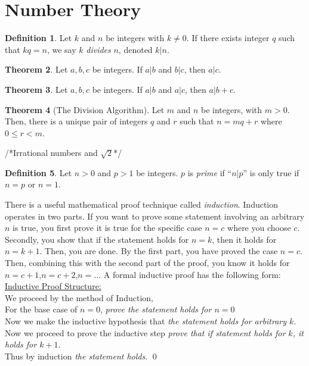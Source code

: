 \documentclass[11pt]{article}
\theoremstyle{definition}
\newtheorem{theorem}{Theorem}[section]
\newtheorem{definition}[theorem]{Definition}
\begin{document}
\section{Number Theory}
\begin{definition}
    Let $k$ and $n$ be integers with $k \neq 0$. If there exists integer $q$ such that $kq=n$, we say $k$ \emph{divides} $n$, denoted $k \vert n$.
\end{definition}
\begin{theorem}
    Let $a,b,c$ be integers. If $a \vert b$ and $b \vert c$, then $a \vert c$.
\end{theorem}
\begin{theorem}
    Let $a,b,c$ be integers. If $a \vert b$ and $a \vert c$, then $a \vert b+c$.
\end{theorem}
\begin{theorem} [The Division Algorithm]
    Let $m$ and $n$ be integers, with $m>0$. Then, there is a unique pair of integers $q$ and $r$ such that $n = mq+r$ where $0 \leq r < m$. 
\end{theorem}
/*Irrational numbers and $\sqrt{2}$*/
\begin{definition}
    Let $n > 0$ and $p > 1$ be integers. $p$ is \emph{prime} if ``$n\vert p$'' is only true if $n=p$ or $n=1$.
\end{definition}
There is a useful mathematical proof technique called \emph{induction}.
Induction operates in two parts. If you want to prove some statement
involving an arbitrary $n$ is true, you first prove it is true for the
specific case $n=c$ where you choose $c$. Secondly, you show that if the
statement holds for $n=k$, then it holds for $n=k+1$. Then, you are done.
By the first part, you have proved the case $n=c$. Then, combining this
with the second part of the proof, you know it holds for $n=c+1$,$n=c+2$,$n=\dots$ A formal inductive proof has the following form:\\
\underline{Inductive Proof Structure:} \\
    We proceed by the method of Induction, \\
    For the base case of $n=0$, \emph{prove the statement holds for $n=0$} \\
    Now we make the inductive hypothesis that \emph{the statement holds for arbitrary $k$}. \\
    Now we proceed to prove the inductive step \emph{prove that if statement holds for $k$, it holds for $k+1$}. \\
    Thus by induction \emph{the statement holds}. \qed
\end{document}

